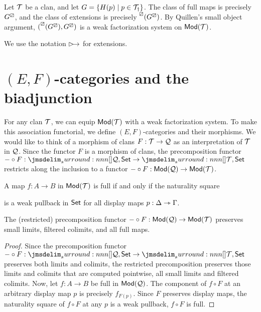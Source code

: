\documentclass[a4paper]{article}
\begin{document}
\begin{remark}
  Let $\mathcal{T}$ be a clan, and let $G = \{H(p) \mid p \in \mathcal{T}_{\dag}\}$.
  The class of full maps is precisely $G^{\boxslash}$, and the class of extensions is precisely $\prescript{\boxslash}{}{(G^{\boxslash})}$.
  By Quillen's small object argument, $(\prescript{\boxslash}{}{(G^{\boxslash})},G^{\boxslash})$ is a weak factorization system on $\mathsf{Mod}(\mathcal{T})$.
\end{remark}

\begin{notation}
  We use the notation $\extension$ for extensions.
\end{notation}

\section{$(E,F)$-categories and the biadjunction}
For any clan $\mathcal{T}$, we can equip $\mathsf{Mod}(\mathcal{T})$ with a weak factorization system.
To make this association functorial, we define $(E,F)$-categories and their morphisms.
We would like to think of a morphism of clans $F : \mathcal{T} \to \mathcal{Q}$ as an interpretation of $\mathcal{T}$ in $\mathcal{Q}$.
Since the functor $F$ is a morphism of clans, the precomposition functor $- \circ F : \funCat{\cQ}{\Set} \to \funCat{\cT}{\Set}$ restricts along the inclusion to a functor $- \circ F : \mathsf{Mod}(\mathcal{Q}) \to \mathsf{Mod}(\mathcal{T})$.

\begin{remark}
  A map $f : A \to B$ in $\mathsf{Mod}(\mathcal{T})$ is full if and only if the naturality square
  \begin{center}
  \end{center}
  is a weak pullback in $\mathsf{Set}$ for all display maps $p : \Delta \rightarrowtriangle \Gamma$.
\end{remark}

\begin{lemma}
  The (restricted) precomposition functor $- \circ F : \mathsf{Mod}(\mathcal{Q}) \to \mathsf{Mod}(\mathcal{T})$ preserves small limits, filtered colimits, and all full maps.
\end{lemma}
\begin{proof}
  Since the precomposition functor $- \circ F : \funCat{\cQ}{\Set} \to \funCat{\cT}{\Set}$ preserves both limits and colimits, the restricted precomposition preserves those limits and colimits that are computed pointwise, \ie all small limits and filtered colimits.
  Now, let $f : A \to B$ be full in $\mathsf{Mod}(\mathcal{Q})$.
  The component of $f \circ F$ at an arbitrary display map $p$ is precisely $f_{F(p)}$.
  Since $F$ preserves display maps, the naturality square of $f \circ F$ at any $p$ is a weak pullback, \ie $f \circ F$ is full.
\end{proof}
\end{document}
